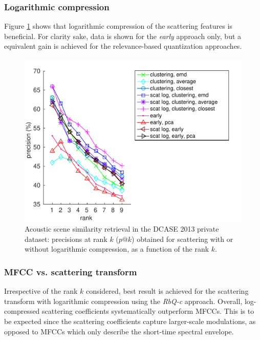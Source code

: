 \documentclass[smallextended]{svjour3}
\makeatletter
\newcommand*{\vs}{vs.\@\xspace}
\newcommand{\ja}[1]{\textcolor{magenta}{Joakim : #1}}
\makeatother
\begin{document}
\subsubsection*{Logarithmic compression}

Figure \ref{fig:ASS_0} shows that logarithmic compression of the scattering features is beneficial. For clarity sake, data is shown  for the \emph{early} approach only, but a equivalent gain is achieved for the relevance-based quantization approaches. %

\begin{figure}[t]
\begin{center}
\includegraphics[width=\columnwidth]{figures/log}
\caption{Acoustic scene similarity retrieval in the DCASE 2013 private dataset: precisions at rank $k$ ($p@k$) obtained for scattering with or without logarithmic compression, as a function of the rank $k$.}
\label{fig:ASS_0}
\end{center}
\end{figure}

\subsubsection*{MFCC \vs scattering transform}

Irrespective of the rank $k$ considered, best result is achieved for the scattering transform with logarithmic compression using the \emph{RbQ-c} approach. Overall, log-compressed scattering coefficients systematically outperform MFCCs. This is to be expected since the scattering coefficients capture larger-scale modulations, as opposed to MFCCs which only describe the short-time spectral envelope.
\end{document}
